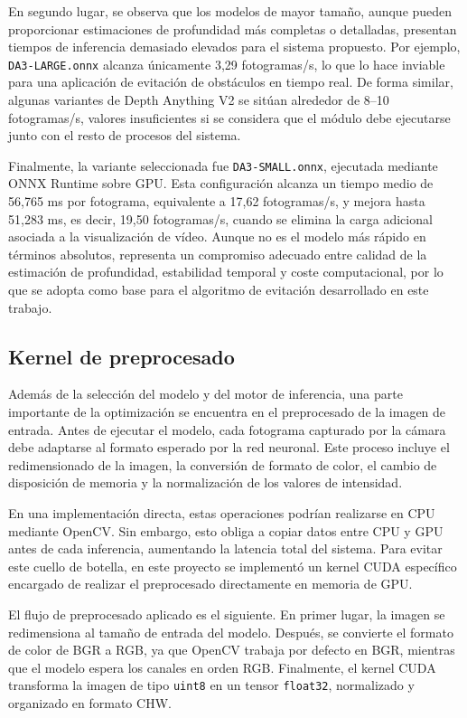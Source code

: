En segundo lugar, se observa que los modelos de mayor tamaño, aunque pueden proporcionar estimaciones de profundidad más completas o detalladas, presentan tiempos de inferencia demasiado elevados para el sistema propuesto. Por ejemplo, \texttt{DA3-LARGE.onnx} alcanza únicamente 3,29 fotogramas/s, lo que lo hace inviable para una aplicación de evitación de obstáculos en tiempo real. De forma similar, algunas variantes de Depth Anything V2 se sitúan alrededor de 8--10 fotogramas/s, valores insuficientes si se considera que el módulo debe ejecutarse junto con el resto de procesos del sistema.

Finalmente, la variante seleccionada fue \texttt{DA3-SMALL.onnx}, ejecutada mediante ONNX Runtime sobre GPU. Esta configuración alcanza un tiempo medio de 56,765 ms por fotograma, equivalente a 17,62 fotogramas/s, y mejora hasta 51,283 ms, es decir, 19,50 fotogramas/s, cuando se elimina la carga adicional asociada a la visualización de vídeo. Aunque no es el modelo más rápido en términos absolutos, representa un compromiso adecuado entre calidad de la estimación de profundidad, estabilidad temporal y coste computacional, por lo que se adopta como base para el algoritmo de evitación desarrollado en este trabajo.

\subsection{Kernel de preprocesado}

Además de la selección del modelo y del motor de inferencia, una parte importante de la optimización se encuentra en el preprocesado de la imagen de entrada. Antes de ejecutar el modelo, cada fotograma capturado por la cámara debe adaptarse al formato esperado por la red neuronal. Este proceso incluye el redimensionado de la imagen, la conversión de formato de color, el cambio de disposición de memoria y la normalización de los valores de intensidad.

En una implementación directa, estas operaciones podrían realizarse en CPU mediante OpenCV. Sin embargo, esto obliga a copiar datos entre CPU y GPU antes de cada inferencia, aumentando la latencia total del sistema. Para evitar este cuello de botella, en este proyecto se implementó un kernel CUDA específico encargado de realizar el preprocesado directamente en memoria de GPU.

El flujo de preprocesado aplicado es el siguiente. En primer lugar, la imagen se redimensiona al tamaño de entrada del modelo. Después, se convierte el formato de color de BGR a RGB, ya que OpenCV trabaja por defecto en BGR, mientras que el modelo espera los canales en orden RGB. Finalmente, el kernel CUDA transforma la imagen de tipo \texttt{uint8} en un tensor \texttt{float32}, normalizado y organizado en formato CHW.

